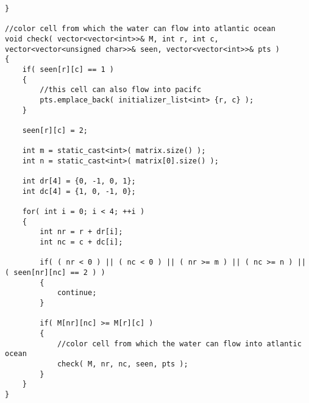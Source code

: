\begin{lstlisting}[style=customc, caption={Depth First Search}]
}

//color cell from which the water can flow into atlantic ocean
void check( vector<vector<int>>& M, int r, int c, vector<vector<unsigned char>>& seen, vector<vector<int>>& pts )
{
    if( seen[r][c] == 1 )
    {
        //this cell can also flow into pacifc
        pts.emplace_back( initializer_list<int> {r, c} );
    }

    seen[r][c] = 2;

    int m = static_cast<int>( matrix.size() );
    int n = static_cast<int>( matrix[0].size() );

    int dr[4] = {0, -1, 0, 1};
    int dc[4] = {1, 0, -1, 0};

    for( int i = 0; i < 4; ++i )
    {
        int nr = r + dr[i];
        int nc = c + dc[i];

        if( ( nr < 0 ) || ( nc < 0 ) || ( nr >= m ) || ( nc >= n ) || ( seen[nr][nc] == 2 ) )
        {
            continue;
        }

        if( M[nr][nc] >= M[r][c] )
        {
            //color cell from which the water can flow into atlantic ocean
            check( M, nr, nc, seen, pts );
        }
    }
}

\end{lstlisting}